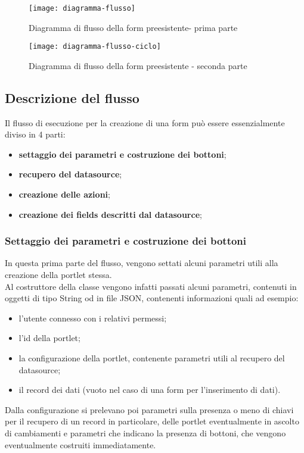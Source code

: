 \begin{figure}[p]
	\centering
	\texttt{[image: diagramma-flusso]}
	\caption{Diagramma di flusso della form preesistente- prima parte}
	\label{form-portlet-flow-diagram-1}
\end{figure}

\begin{figure}[p]
	\centering
	\texttt{[image: diagramma-flusso-ciclo]}
	\caption{Diagramma di flusso della form preesistente - seconda parte}
	\label{form-portlet-flow-diagram-2}
\end{figure}

\subsection{Descrizione del flusso}
Il flusso di esecuzione per la creazione di una form può essere essenzialmente diviso in 4 parti: 
\begin{itemize}
	\item \textbf{settaggio dei parametri e costruzione dei bottoni};
	\item \textbf{recupero del datasource};
	\item \textbf{creazione delle azioni};
	\item \textbf{creazione dei fields descritti dal datasource};
\end{itemize}
\subsubsection{Settaggio dei parametri e costruzione dei bottoni}
In questa prima parte del flusso, vengono settati alcuni parametri utili alla creazione della \gls{portlet} stessa.\\
Al costruttore della classe vengono infatti passati alcuni parametri, contenuti in oggetti di tipo String od in file JSON, contenenti informazioni quali ad esempio:
\begin{itemize}
	\item l'utente connesso con i relativi permessi;
	\item l'id della \gls{portlet};
	\item la configurazione della portlet, contenente parametri utili al recupero del datasource;
	\item il \gls{record} dei dati (vuoto nel caso di una form per l'inserimento di dati).
\end{itemize}
Dalla configurazione si prelevano poi parametri sulla presenza o meno di chiavi per il recupero di un \gls{record} in particolare, delle \gls{portlet} eventualmente in ascolto di cambiamenti e parametri che indicano la presenza di bottoni, che vengono eventualmente costruiti immediatamente.\\
